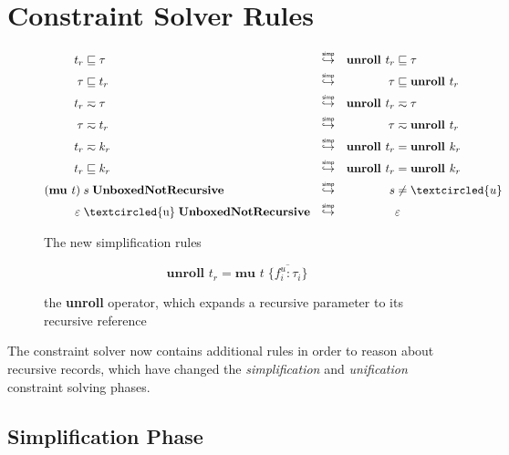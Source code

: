 \section{Constraint Solver Rules}

\begin{figure}
    \centering
    \begin{align}
       t_r  &\subtype \tau  & \simp  && \textbf{unroll } t_r  &\subtype  \tau \label{eq:firsteq} \\
       \tau &\subtype t_r   & \simp  && \tau                  &\subtype  \textbf{unroll } t_r \\
       t_r  &\typeeq  \tau  & \simp  && \textbf{unroll } t_r  &\typeeq   \tau \\
       \tau &\typeeq  t_r   & \simp  && \tau                  &\typeeq   \textbf{unroll } t_r \label{eq:lasteq} \\
       t_r  &\typeeq  k_r   & \simp  && \textbf{unroll } t_r  &=         \textbf{unroll } k_r \label{eq:firstrecs} \\
       t_r  &\subtype k_r   & \simp  && \textbf{unroll } t_r  &=         \textbf{unroll } k_r \label{eq:lastrecs} \\
       (\textbf{mu } t)\; &s\; \textbf{UnboxedNotRecursive}   
            & \simp &&  s &\neq \textcircled{u} \label{eq:firstunbox} \\
       \varepsilon\; &\text{\textcircled{u}}\; \textbf{UnboxedNotRecursive} 
            & \simp &&  &\varepsilon \label{eq:lastunbox}
    \end{align}
    \caption{The new simplification rules}
    \label{fig:simprules}
\end{figure}

\begin{figure}
    \centering
    \[
        \textbf{unroll } t_r = \textbf{mu } t\; \{ \overline{f_i^u : \tau_i} \} 
    \]
    \caption{the \textbf{unroll} operator, which expands a recursive parameter
             to its recursive reference}
    \label{fig:unrolldef}
\end{figure}

The constraint solver now contains additional rules in order to reason about recursive
records, which have changed the \textit{simplification} and \textit{unification}
constraint solving phases.

\subsection{Simplification Phase}

